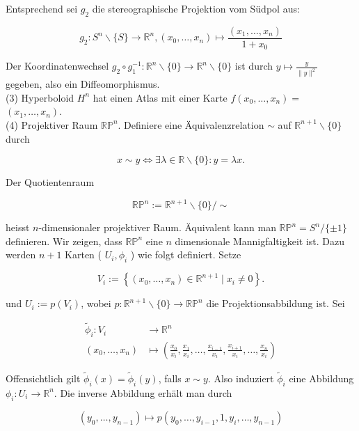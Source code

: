 \documentclass[10pt]{article}
\begin{document}
Entsprechend sei $g_{2}$ die stereographische Projektion vom Südpol aus:

$$
g_{2}: S^{n} \backslash\{S\} \rightarrow \mathbb{R}^{n},\left(x_{0}, \ldots, x_{n}\right) \mapsto \frac{\left(x_{1}, \ldots, x_{n}\right)}{1+x_{0}}
$$

Der Koordinatenwechsel $g_{2} \circ g_{1}^{-1}: \mathbb{R}^{n} \backslash\{0\} \rightarrow \mathbb{R}^{n} \backslash\{0\}$ ist durch $y \mapsto \frac{y}{\|y\|^{2}}$ gegeben, also ein Diffeomorphismus.\\
(3) Hyperboloid $H^{n}$ hat einen Atlas mit einer Karte $f\left(x_{0}, \ldots, x_{n}\right)=$ $\left(x_{1}, \ldots, x_{n}\right)$.\\
(4) Projektiver Raum $\mathbb{R P}^{n}$. Definiere eine Äquivalenzrelation $\sim$ auf $\mathbb{R}^{n+1} \backslash\{0\}$ durch

$$
x \sim y \Longleftrightarrow \exists \lambda \in \mathbb{R} \backslash\{0\}: y=\lambda x .
$$

Der Quotientenraum

$$
\mathbb{R P}^{n}:=\mathbb{R}^{n+1} \backslash\{0\} / \sim
$$

heisst $n$-dimensionaler projektiver Raum. Äquivalent kann man $\mathbb{R} \mathbb{P}^{n}=S^{n} /\{ \pm 1\}$ definieren. Wir zeigen, dass $\mathbb{R} \mathbb{P}^{n}$ eine $n$ dimensionale Mannigfaltigkeit ist. Dazu werden $n+1$ Karten ( $U_{i}, \phi_{i}$ ) wie folgt definiert. Setze

$$
V_{i}:=\left\{\left(x_{0}, \ldots, x_{n}\right) \in \mathbb{R}^{n+1} \mid x_{i} \neq 0\right\} .
$$

und $U_{i}:=p\left(V_{i}\right)$, wobei $p: \mathbb{R}^{n+1} \backslash\{0\} \rightarrow \mathbb{R} \mathbb{P}^{n}$ die Projektionsabbildung ist. Sei

$$
\begin{aligned}
\tilde{\phi}_{i}: V_{i} & \rightarrow \mathbb{R}^{n} \\
\left(x_{0}, \ldots, x_{n}\right) & \mapsto\left(\frac{x_{0}}{x_{i}}, \frac{x_{1}}{x_{i}}, \ldots, \frac{x_{i-1}}{x_{i}}, \frac{x_{i+1}}{x_{i}}, \ldots, \frac{x_{n}}{x_{i}}\right)
\end{aligned}
$$

Offensichtlich gilt $\tilde{\phi}_{i}(x)=\tilde{\phi}_{i}(y)$, falls $x \sim y$. Also induziert $\tilde{\phi}_{i}$ eine Abbildung $\phi_{i}: U_{i} \rightarrow \mathbb{R}^{n}$. Die inverse Abbildung erhält man durch

$$
\left(y_{0}, \ldots, y_{n-1}\right) \mapsto p\left(y_{0}, \ldots, y_{i-1}, 1, y_{i}, \ldots, y_{n-1}\right)
$$
\end{document}
